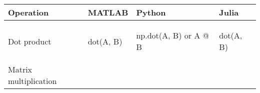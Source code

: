 \documentclass[10pt, landscape]{article}
\newenvironment{Shaded}{}{}
\newcommand{\OperatorTok}[1]{\textcolor[rgb]{0.40,0.40,0.40}{{#1}}}
\newcommand{\NormalTok}[1]{{#1}}
\begin{document}
\begin{multicols}{2}
\begin{tabular}[ ]{@{}llll@{}}
\toprule
\begin{minipage}[b]{0.23\columnwidth}\raggedright\strut
Operation\strut
\end{minipage} & \begin{minipage}[b]{0.22\columnwidth}\raggedright\strut
MATLAB\strut
\end{minipage} & \begin{minipage}[b]{0.23\columnwidth}\raggedright\strut
Python\strut
\end{minipage} & \begin{minipage}[b]{0.20\columnwidth}\raggedright\strut
Julia\strut
\end{minipage}\tabularnewline
\midrule
\begin{minipage}[t]{0.23\columnwidth}\raggedright\strut
Dot product\strut
\end{minipage} & \begin{minipage}[t]{0.22\columnwidth}\raggedright\strut
\begin{Shaded}
\begin{Highlighting}[]
\NormalTok{dot(A, B)}
\end{Highlighting}
\end{Shaded}
\strut
\end{minipage} & \begin{minipage}[t]{0.23\columnwidth}\raggedright\strut
\begin{Shaded}
\begin{Highlighting}[]
\NormalTok{np.dot(A, B) }\OperatorTok{or} \NormalTok{A @ B}
\end{Highlighting}
\end{Shaded}
\strut
\end{minipage} & \begin{minipage}[t]{0.20\columnwidth}\raggedright\strut
\begin{Shaded}
\begin{Highlighting}[]
\NormalTok{dot(A, B)}
\end{Highlighting}
\end{Shaded}
\strut
\end{minipage}\tabularnewline
\begin{minipage}[t]{0.23\columnwidth}\raggedright\strut
Matrix multiplication\strut
\end{minipage} & \begin{minipage}[t]{0.22\columnwidth}\raggedright\strut
\begin{Shaded}
\begin{Highlighting}[]

\end{Highlighting}
\end{Shaded}
\end{minipage}
\end{tabular}
\end{multicols}
\end{document}
